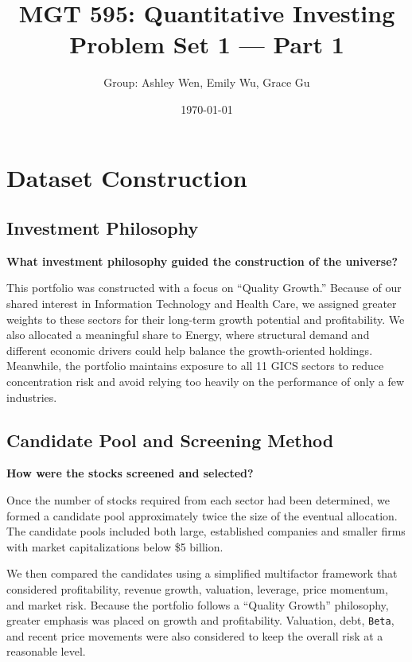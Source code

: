 \documentclass[11pt]{article}
\title{MGT 595: Quantitative Investing \\ Problem Set 1 --- Part 1}
\author{Group: Ashley Wen, Emily Wu, Grace Gu}
\date{\today}
\begin{document}
\maketitle

\setcounter{section}{-1}

\section{Dataset Construction}

\subsection{Investment Philosophy}

\textbf{What investment philosophy guided the construction of the universe?}

This portfolio was constructed with a focus on ``Quality Growth.'' Because of
our shared interest in Information Technology and Health Care, we assigned
greater weights to these sectors for their long-term growth potential and
profitability. We also allocated a meaningful share to Energy, where structural
demand and different economic drivers could help balance the growth-oriented
holdings. Meanwhile, the portfolio maintains exposure to all 11 GICS sectors
to reduce concentration risk and avoid relying too heavily on the performance
of only a few industries.

\subsection{Candidate Pool and Screening Method}

\textbf{How were the stocks screened and selected?}

Once the number of stocks required from each sector had been determined, we
formed a candidate pool approximately twice the size of the eventual
allocation. The candidate pools included both large, established companies
and smaller firms with market capitalizations below \$5 billion.

We then compared the candidates using a simplified multifactor framework that
considered profitability, revenue growth, valuation, leverage, price momentum,
and market risk. Because the portfolio follows a ``Quality Growth'' philosophy,
greater emphasis was placed on growth and profitability. Valuation, debt,
\texttt{Beta}, and recent price movements were also considered to keep the
overall risk at a reasonable level.
\end{document}
